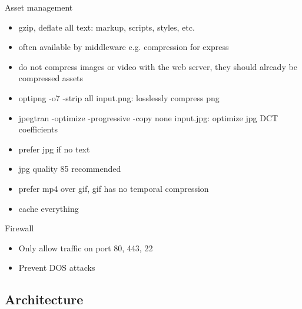 \documentclass{beamer}
\begin{document}
\begin{frame}{Asset management}
  \begin{itemize}
    \item gzip, deflate all text: markup, scripts, styles, etc.
    \item often available by middleware e.g. compression for express
    \item do not compress images or video with the web server, they should
      already be compressed assets
    \item optipng -o7 -strip all input.png: losslessly compress png
    \item jpegtran -optimize -progressive -copy none input.jpg: optimize jpg
      DCT coefficients
    \item prefer jpg if no text
    \item jpg quality 85 recommended
    \item prefer mp4 over gif, gif has no temporal compression
    \item cache everything
  \end{itemize}
\end{frame}

\begin{frame}{Firewall}
  \begin{itemize}
    \item Only allow traffic on port 80, 443, 22
    \item Prevent DOS attacks
  \end{itemize}
\end{frame}

\subsection{Architecture}
\end{document}
